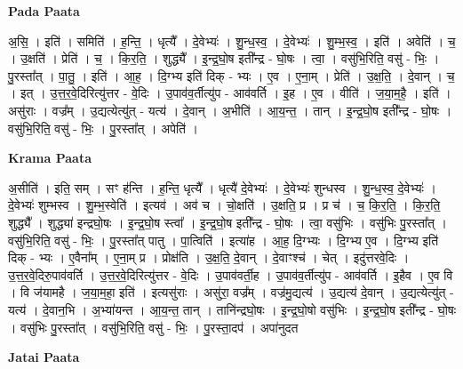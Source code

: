 \documentclass[17pt]{extarticle}
\begin{document}
\textbf{Pada Paata} \newline

अ॒सि॒ । इति॑ । समिति॑ । ह॒न्ति॒ । धृत्यै᳚ । दे॒वेभ्यः॑ । शु॒न्ध॒स्व॒ । दे॒वेभ्यः॑ । शु॒म्भ॒स्व॒ । इति॑ । अवेति॑ । च॒ । उ॒क्षति॑ । प्रेति॑ । च॒ । कि॒र॒ति॒ । शुद्ध्यै᳚ । इ॒न्द्र॒घो॒ष इती᳚न्द्र - घो॒षः । त्वा॒ । वसु॑भि॒रिति॒ वसु॑ - भिः॒ । पु॒रस्ता᳚त् । पा॒तु॒ । इति॑ । आ॒ह॒ । दि॒ग्भ्य इति॑ दिक् - भ्यः । ए॒व । ए॒ना॒म् । प्रेति॑ । उ॒क्ष॒ति॒ । दे॒वान् । च॒ । इत् । उ॒त्त॒र॒वे॒दिरित्यु॑त्तर - वे॒दिः । उ॒पाव॑व॒र्तीत्यु॑प - आव॑वर्ति । इ॒ह । ए॒व । वीति॑ । ज॒या॒म॒है॒ । इति॑ । असु॑राः । वज्र᳚म् । उ॒द्यत्येत्यु॑त् - यत्य॑ । दे॒वान् । अ॒भीति॑ । आ॒य॒न्त॒ । तान् । इ॒न्द्र॒घो॒ष इती᳚न्द्र - घो॒षः । वसु॑भि॒रिति॒ वसु॑ - भिः॒ । पु॒रस्ता᳚त् । अपेति॑ ।  \newline


\textbf{Krama Paata} \newline

अ॒सीति॑ । इति॒ सम् । सꣳ ह॑न्ति । ह॒न्ति॒ धृत्यै᳚ । धृत्यै॑ दे॒वेभ्यः॑ । दे॒वेभ्यः॑ शुन्धस्व । शु॒न्ध॒स्व॒ दे॒वेभ्यः॑ । दे॒वेभ्यः॑ शुम्भस्व । शु॒म्भ॒स्वेति॑ । इत्यव॑ । अव॑ च । चो॒क्षति॑ । उ॒क्षति॒ प्र । प्र च॑ । च॒ कि॒र॒ति॒ । कि॒र॒ति॒ शुद्ध्यै᳚ । शुद्ध्या॑ इन्द्रघो॒षः । इ॒न्द्र॒घो॒ष स्त्वा᳚ । इ॒न्द्र॒घो॒ष इती᳚न्द्र - घो॒षः । त्वा॒ वसु॑भिः । वसु॑भिः पु॒रस्ता᳚त् । वसु॑भि॒रिति॒ वसु॑ - भिः॒ । पु॒रस्ता᳚त् पातु । पा॒त्विति॑ । इत्या॑ह । आ॒ह॒ दि॒ग्भ्यः । दि॒ग्भ्य ए॒व । दि॒ग्भ्य इति॑ दिक् - भ्यः । ए॒वैना᳚म् । ए॒ना॒म् प्र । प्रोक्ष॑ति । उ॒क्ष॒ति॒ दे॒वान् । दे॒वाꣳश्च॑ । चेत् । इदु॑त्तरवे॒दिः । उ॒त्त॒र॒वे॒दिरु॒पाव॑वर्ति । उ॒त्त॒र॒वे॒दिरित्यु॑त्तर - वे॒दिः । उ॒पाव॑वर्ती॒ह । उ॒पाव॑व॒र्तीत्यु॑प - आव॑वर्ति । इ॒हैव । ए॒व वि । वि ज॑यामहै । ज॒या॒म॒हा॒ इति॑ । इत्यसु॑राः । असु॑रा॒ वज्र᳚म् । वज्र॑मु॒द्यत्य॑ । उ॒द्यत्य॑ दे॒वान् । उ॒द्यत्येत्यु॑त् - यत्य॑ । दे॒वान॒भि । अ॒भ्या॑यन्त । आ॒य॒न्त॒ तान् । तानि॑न्द्रघो॒षः । इ॒न्द्र॒घो॒षो वसु॑भिः । इ॒न्द्र॒घो॒ष इती᳚न्द्र - घो॒षः । वसु॑भिः पु॒रस्ता᳚त् । वसु॑भि॒रिति॒ वसु॑ - भिः॒ । पु॒रस्ता॒दप॑ । अपा॑नुदत \newline

\textbf{Jatai Paata} \newline
\end{document}
